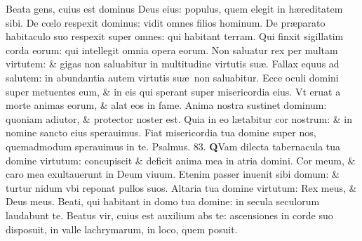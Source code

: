 \documentclass[a5paper,10pt]{book}
\def\ae{æ}
\def\oe{œ}
\begin{document}
\begin{multicols*}{2}
\newline \color{red} B\color{black}eata gens, cuius est dominus Deus eius: populus, quem elegit in h\ae reditatem sibi.
\newline \color{red} D\color{black}e c\oe lo respexit dominus: vidit omnes filios hominum.
\newline \color{red} D\color{black}e pr\ae parato habitaculo suo respexit super omnes: qui habitant terram.
\newline \color{red} Q\color{black}ui finxit sigillatim corda eorum: qui intellegit omnia opera eorum.
\newline \color{red} N\color{black}on saluatur rex per multam virtutem: \& gigas non saluabitur in multitudine virtutis su\ae .
\newline \color{red} F\color{black}allax equus ad salutem: in abundantia autem virtutis su\ae \ non saluabitur.
\newline \color{red} E\color{black}cce oculi domini super metuentes eum, \& in eis qui sperant super misericordia eius.
\newline \color{red} V\color{black}t eruat a morte animas eorum, \& alat eos in fame.
\newline \color{red} A\color{black}nima nostra sustinet dominum: quoniam adiutor, \& protector noster est.
\newline \color{red} Q\color{black}uia in eo l\ae tabitur cor nostrum: \& in nomine sancto eius sperauimus.
\newline \color{red} F\color{black}iat misericordia tua domine super nos, quemadmodum sperauimus in te.
\newline \color{red} Psalmus. \hypertarget{ps83}{83.} \color{black}
\vspace{-.5em}
\lettrine[lines=2]{\bfseries \color{red} Q}{}Vam dilecta tabernacula tua domine virtutum: concupiscit \& deficit anima mea in atria domini.
\newline \color{red} C\color{black}or meum, \& caro mea exultauerunt in Deum viuum.
\newline \color{red} E\color{black}tenim passer inuenit sibi domum: \& turtur nidum vbi reponat pullos suos.%
\newline \color{red} A\color{black}ltaria tua domine virtutum: Rex meus, \& Deus meus.
\newline \color{red} B\color{black}eati, qui habitant in domo tua domine: in secula seculorum laudabunt te.
\newline \color{red} B\color{black}eatus vir, cuius est auxilium abs te: ascensiones in corde suo disposuit, in valle lachrymarum, in loco, quem posuit.

\end{multicols*}
\end{document}
